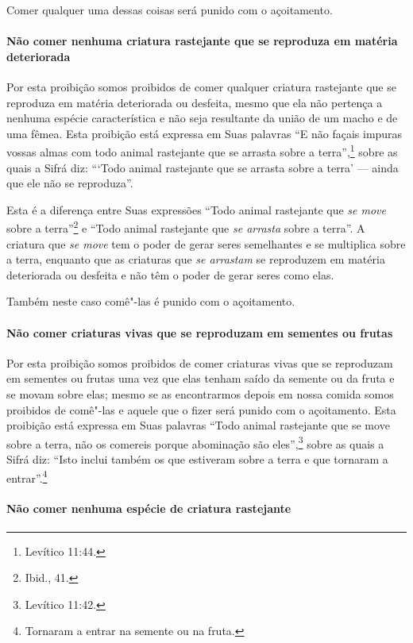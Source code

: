 \begin{multicols}{2}
Comer qualquer uma dessas coisas será punido com o açoitamento.

\paragraph{Não comer nenhuma criatura rastejante que se reproduza em matéria
deteriorada}

Por esta proibição somos proibidos de comer qualquer criatura
rastejante que se reproduza em matéria deteriorada ou desfeita, mesmo
que ela não pertença a nenhuma espécie característica e não seja
resultante da união de um macho e de uma fêmea. Esta proibição está
expressa em Suas palavras
``E não façais impuras vossas almas com todo animal rastejante que se
arrasta sobre a terra'',\footnote{Levítico 11:44.} sobre as quais a Sifrá\starr{} diz:
```Todo animal rastejante que se arrasta sobre a terra' --- ainda que
ele não se reproduza''.

Esta é a diferença entre Suas expressões ``Todo animal rastejante que
\emph{se move} sobre a terra''\footnote{Ibid., 41.} e ``Todo animal rastejante
que \emph{se arrasta} sobre a terra''. A criatura que \emph{se move} tem
o poder de gerar seres semelhantes e se multiplica sobre a terra,
enquanto que as criaturas que \emph{se arrastam} se reproduzem em
matéria deteriorada ou desfeita e não têm o poder de gerar seres como
elas.

Também neste caso comê"-las é punido com o açoitamento.

\paragraph{Não comer criaturas vivas que se reproduzam em sementes ou frutas}

Por esta proibição somos proibidos de comer criaturas vivas que se
reproduzam em sementes ou frutas uma vez que elas tenham saído da
semente ou da fruta e se movam sobre elas; mesmo se as encontrarmos
depois em nossa comida somos proibidos de comê"-las e aquele que o fizer
será punido com o açoitamento. Esta proibição está expressa em Suas
palavras ``Todo animal rastejante que se move sobre a terra, não os
comereis porque abominação são eles'',\footnote{Levítico 11:42.} sobre as quais a
Sifrá\starr{} diz: ``Isto inclui também os que estiveram sobre a terra e que
tornaram a entrar''.\footnote{Tornaram a entrar na semente ou na fruta.}

\paragraph{Não comer nenhuma espécie de criatura rastejante}


\end{multicols}
